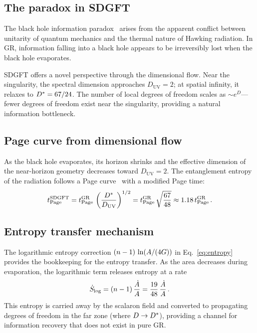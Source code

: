 \documentclass[amsmath,amssymb,aps,prd,twocolumn,superscriptaddress,nofootinbib]{revtex4-2}
\begin{document}
\subsection{The paradox in SDGFT}

The black hole information paradox~\cite{Hawking1976,Mathur2009}
arises from the apparent conflict between unitarity of quantum
mechanics and the thermal nature of Hawking radiation.  In GR,
information falling into a black hole appears to be irreversibly
lost when the black hole evaporates.

SDGFT offers a novel perspective through the dimensional flow.
Near the singularity, the spectral dimension approaches
$D_{\mathrm{UV}} = 2$; at spatial infinity, it relaxes to
$D^{*} = 67/24$.  The number of local degrees of freedom scales
as $\sim e^D$---fewer degrees of freedom exist near the
singularity, providing a natural information bottleneck.

\subsection{Page curve from dimensional flow}

As the black hole evaporates, its horizon shrinks and the effective
dimension of the near-horizon geometry decreases toward
$D_{\mathrm{UV}} = 2$.  The entanglement entropy of the radiation
follows a Page curve~\cite{Page1993} with a modified Page time:
\begin{equation}
  t_{\mathrm{Page}}^{\mathrm{SDGFT}}
    = t_{\mathrm{Page}}^{\mathrm{GR}}\,
      \left(\frac{D^{*}}{D_{\mathrm{UV}}}\right)^{1/2}
    = t_{\mathrm{Page}}^{\mathrm{GR}}\,
      \sqrt{\frac{67}{48}}
    \approx 1.18\,t_{\mathrm{Page}}^{\mathrm{GR}}\,.
  \label{eq:Page_time}
\end{equation}

\subsection{Entropy transfer mechanism}

The logarithmic entropy correction $(n - 1)\,\ln(A/(4G))$ in
Eq.~\eqref{eq:entropy} provides the bookkeeping for the entropy
transfer.  As the area decreases during evaporation, the
logarithmic term releases entropy at a rate
\begin{equation}
  \dot{S}_{\mathrm{log}} = (n - 1)\,\frac{\dot{A}}{A}
    = \frac{19}{48}\,\frac{\dot{A}}{A}\,.
  \label{eq:entropy_release}
\end{equation}
This entropy is carried away by the scalaron field and converted
to propagating degrees of freedom in the far zone (where $D \to
D^{*}$), providing a channel for information recovery that does
not exist in pure GR.
\end{document}
